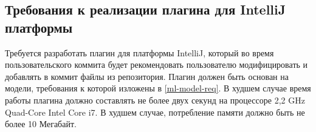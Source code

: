 \subsection{Требования к реализации плагина для IntelliJ платформы}\label{impl-req}
Требуется разработать плагин для платформы IntelliJ, который во время пользовательского коммита будет рекомендовать пользователю модифицировать и добавлять в коммит файлы из репозитория. Плагин должен быть основан на модели, требования к которой изложены в \ref{ml-model-req}. В худшем случае время работы плагина должно составлять не более двух секунд на процессоре 2,2 GHz Quad-Core Intel Core i7. В худшем случае, потребление памяти должно быть не более 10 Мегабайт.

\chapterconclusion